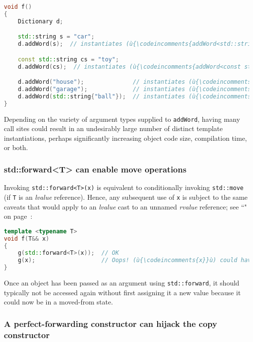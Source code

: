 \begin{lstlisting}[language=C++]
void f()
{
    Dictionary d;

    std::string s = "car";
    d.addWord(s);  // instantiates (ù{\codeincomments{addWord<std::string\&>}}ù)

    const std::string cs = "toy";
    d.addWord(cs);  // instantiates (ù{\codeincomments{addWord<const std::string\&>}}ù)

    d.addWord("house");              // instantiates (ù{\codeincomments{addWord<char const(\&)[6]>}}ù)
    d.addWord("garage");             // instantiates (ù{\codeincomments{addWord<char const(\&)[7]>}}ù)
    d.addWord(std::string{"ball"});  // instantiates (ù{\codeincomments{addWord<std::string\&\&>}}ù)
}
\end{lstlisting}

\noindent Depending on the variety of argument types supplied to \texttt{addWord},
having many call sites could result in an undesirably large number of
distinct template instantiations, perhaps significantly increasing
object code size, compilation time, or both.

\subsubsection[{\tt std::forward<T>} can enable move operations]{{\SubsubsecCode std::forward<T>} can enable move operations}\label{std::forward<t>-can-enable-move-operations}

Invoking \texttt{std::forward<T>(x)} is equivalent to conditionally
invoking \texttt{std::move} (if \texttt{T} is an
\emph{lvalue} reference). Hence, any subsequent use of \texttt{x} is
subject to the same caveats that would apply to an \emph{lvalue} cast to
an unnamed \emph{rvalue} reference; see ``" on page~\pageref{Rvalue-References}:

\begin{lstlisting}[language=C++]
template <typename T>
void f(T&& x)
{
    g(std::forward<T>(x));  // OK
    g(x);                   // Oops! (ù{\codeincomments{x}}ù) could have already been moved from.
}
\end{lstlisting}

\noindent Once an object has been passed as an argument using
\texttt{std::forward}, it should typically not be accessed again
without first assigning it a new value because it could now be in a
moved-from state.

\subsubsection[A perfect-forwarding constructor can hijack the copy constructor]{A perfect-forwarding constructor can hijack the copy constructor}\label{a-perfect-forwarding-constructor-can-hijack-the-copy-constructor}

